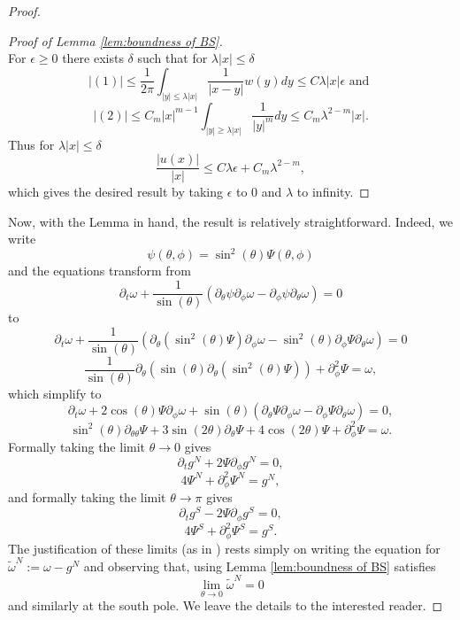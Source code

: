 \documentclass[10pt]{article}
\numberwithin{equation}{section}
\theoremstyle{plain}
\theoremstyle{definition}
\newcommand{\abs}[1]{\left| #1 \right|}
\numberwithin{equation}{section}
\begin{document}
\begin{proof}
\begin{proof}[Proof of Lemma \ref{lem:boundness of BS}]
\[\]
For $\epsilon \geq 0$ there exists $\delta$ such that for $\lambda \abs{x}\leq \delta$
\[
\abs{(1)}\leq \frac{1}{2\pi}\int_{\abs{y}\leq \lambda \abs{x}}\frac{1}{\abs{x-y}}w(y)dy\leq C \lambda \abs{x} \epsilon \text{ and }
\]
\[
\abs{(2)}\leq C_m \abs{x}^{m-1}\int_{\abs{y}\geq \lambda \abs{x}}\frac{1}{\abs{y}^m}dy\leq C_m\lambda^{2-m}\abs{x}.
\]
Thus for $\lambda \abs{x}\leq \delta$
\[
\frac{\abs{u(x)}}{\abs{x}}\leq C \lambda \epsilon+ C_m\lambda^{2-m},
\]
which gives the desired result by taking $\epsilon$ to $0$ and $\lambda$ to infinity.
\end{proof}
Now, with the Lemma in hand, the result is relatively straightforward. Indeed, we write 
\[\psi(\theta,\phi)=\sin^2(\theta)\Psi(\theta,\phi)\] and the equations transform from 
\[\partial_t \omega +\frac{1}{\sin(\theta)}(\partial_\theta\psi\partial_\phi\omega-\partial_\phi\psi\partial_\theta\omega)=0\]
to
\[\partial_t \omega +\frac{1}{\sin(\theta)}(\partial_\theta(\sin^2(\theta)\Psi)\partial_\phi\omega-\sin^2(\theta)\partial_\phi\Psi\partial_\theta\omega)=0\]
\[
\frac{1}{\sin(\theta)}\partial_\theta( \sin(\theta)\partial_\theta (\sin^2(\theta)\Psi))+\partial_{\phi}^2\Psi=\omega,\]
which simplify to 
\[\partial_t\omega +2\cos(\theta)\Psi\partial_\phi\omega+\sin(\theta)(\partial_\theta\Psi\partial_\phi\omega-\partial_\phi\Psi\partial_\theta\omega)=0,\]
\[ \sin^2(\theta)\partial_{\theta\theta}\Psi+3\sin(2\theta)\partial_\theta\Psi+4\cos(2\theta)\Psi +\partial_\phi^2\Psi =\omega.\] Formally taking the limit $\theta\rightarrow 0$ gives 
\[\partial_tg^N+2\Psi\partial_\phi g^N=0,\]
\[4\Psi^N+\partial_{\phi}^2\Psi^N=g^N,\] 
and formally taking the limit $\theta\rightarrow \pi$ gives
\[\partial_tg^S-2\Psi\partial_\phi g^S=0,\]
\[4\Psi^S+\partial_{\phi}^2\Psi^S=g^S.\] The justification of these limits (as in \cite{EJ-symmetries}) rests simply on writing the equation for  $\tilde\omega^N:=\omega-g^N$ and observing that, using Lemma \ref{lem:boundness of BS} satisfies
\[\lim_{\theta\rightarrow 0} \tilde\omega^N=0\] and similarly at the south pole. We leave the details to the interested reader.  



\end{proof}
\end{document}

